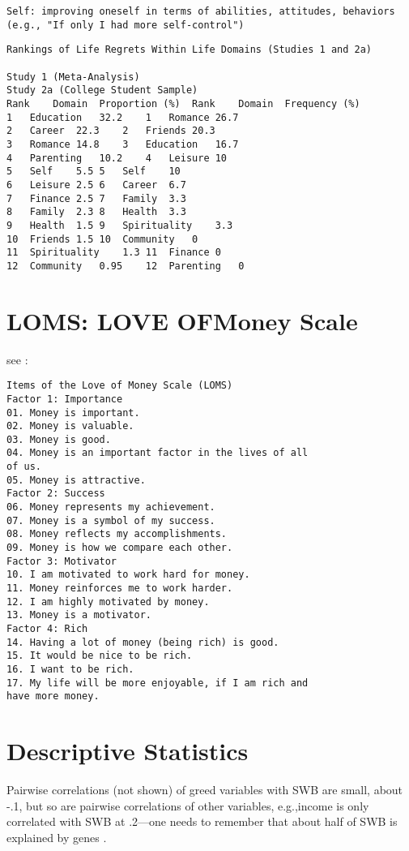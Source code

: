 \documentclass[10pt, letterpaper]{article}
\begin{document}
\begin{spacing}{1.8}
\begin{verbatim}
Self: improving oneself in terms of abilities, attitudes, behaviors (e.g., "If only I had more self-control")
\end{verbatim}


\begin{verbatim}
Rankings of Life Regrets Within Life Domains (Studies 1 and 2a)

Study 1 (Meta-Analysis)
Study 2a (College Student Sample)
Rank	Domain	Proportion (%)	Rank	Domain	Frequency (%)
1	Education	32.2	1	Romance	26.7
2	Career	22.3	2	Friends	20.3
3	Romance	14.8	3	Education	16.7
4	Parenting	10.2	4	Leisure	10
5	Self	5.5	5	Self	10
6	Leisure	2.5	6	Career	6.7
7	Finance	2.5	7	Family	3.3
8	Family	2.3	8	Health	3.3
9	Health	1.5	9	Spirituality	3.3
10	Friends	1.5	10	Community	0
11	Spirituality	1.3	11	Finance	0
12	Community	0.95	12	Parenting	0
\end{verbatim}

\section{LOMS: LOVE OFMoney Scale}

see \citet{tang2003income}:

\begin{verbatim}
Items of the Love of Money Scale (LOMS)
Factor 1: Importance
01. Money is important.
02. Money is valuable.
03. Money is good.
04. Money is an important factor in the lives of all
of us.
05. Money is attractive.
Factor 2: Success
06. Money represents my achievement.
07. Money is a symbol of my success.
08. Money reflects my accomplishments.
09. Money is how we compare each other.
Factor 3: Motivator
10. I am motivated to work hard for money.
11. Money reinforces me to work harder.
12. I am highly motivated by money.
13. Money is a motivator.
Factor 4: Rich
14. Having a lot of money (being rich) is good.
15. It would be nice to be rich.
16. I want to be rich.
17. My life will be more enjoyable, if I am rich and
have more money.
\end{verbatim}

\section{Descriptive Statistics}

%

%
%
%

Pairwise correlations (not shown) of greed variables with SWB are small, about
-.1, but so are pairwise correlations of other variables, e.g.,income is only correlated with SWB at  .2---one needs to remember that about half of SWB is explained by genes \citep{lykken96}.



\end{spacing}
\end{document}
